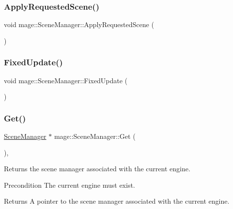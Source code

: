 \subsubsection{\texorpdfstring{Apply\+Requested\+Scene()}{ApplyRequestedScene()}}
{\footnotesize\ttfamily void mage\+::\+Scene\+Manager\+::\+Apply\+Requested\+Scene (\begin{DoxyParamCaption}{ }\end{DoxyParamCaption})\hspace{0.3cm}{\ttfamily [private]}}

\hypertarget{classmage_1_1_scene_manager_a6d97c0fb7945aeb53ec950e62567c1f4}{}\label{classmage_1_1_scene_manager_a6d97c0fb7945aeb53ec950e62567c1f4} 
\subsubsection{\texorpdfstring{Fixed\+Update()}{FixedUpdate()}}
{\footnotesize\ttfamily void mage\+::\+Scene\+Manager\+::\+Fixed\+Update (\begin{DoxyParamCaption}{ }\end{DoxyParamCaption})}

\hypertarget{classmage_1_1_scene_manager_a282dbbea100d7de48c0b0876619db5e7}{}\label{classmage_1_1_scene_manager_a282dbbea100d7de48c0b0876619db5e7} 
\subsubsection{\texorpdfstring{Get()}{Get()}}
{\footnotesize\ttfamily \hyperlink{classmage_1_1_scene_manager}{Scene\+Manager} $\ast$ mage\+::\+Scene\+Manager\+::\+Get (\begin{DoxyParamCaption}{ }\end{DoxyParamCaption})\hspace{0.3cm}{\ttfamily [static]}, {\ttfamily [noexcept]}}

Returns the scene manager associated with the current engine.

\begin{DoxyPrecond}{Precondition}
The current engine must exist. 
\end{DoxyPrecond}
\begin{DoxyReturn}{Returns}
A pointer to the scene manager associated with the current engine. 
\end{DoxyReturn}
\hypertarget{classmage_1_1_scene_manager_a44a10fe134b9c0215d9b4628b7c63994}{}\label{classmage_1_1_scene_manager_a44a10fe134b9c0215d9b4628b7c63994} 
